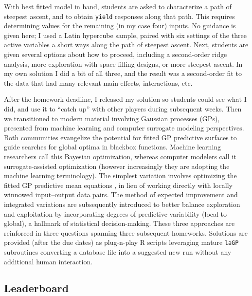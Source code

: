 \documentclass[12pt]{article}
\begin{document}
With best fitted model in hand, students are asked to characterize a path of
steepest ascent, and to obtain {\tt yield} responses along that path.  This
requires determining values for the remaining (in my case four) inputs. No
guidance is given here; I used a Latin hypercube sample, paired with six
settings of the three active variables a short ways along the path of steepest
ascent.  Next, students are given several options about how to proceed,
including a second-order ridge analysis, more exploration with space-filling
designs, or more steepest ascent.  In my own solution I did a bit of all
three, and the result was a second-order fit to the data that had many
relevant main effects, interactions, etc.

After the homework deadline, I released my solution so students could see what
I did, and use it to ``catch up'' with other players during subsequent weeks.
Then we transitioned to modern material involving Gaussian processes (GPs),
presented from machine learning \citep{rasmu:will:2006} and computer surrogate
modeling \citep{sant:will:notz:2003} perspectives.  Both communities
evangelize the potential for fitted GP predictive surfaces to guide searches
for global optima in blackbox functions. Machine learning researchers call
this Bayesian optimization, whereas computer modelers call it
surrogate-assisted optimization (however increasingly they are adopting the
machine learning terminology).  The simplest variation involves optimizing the
fitted GP predictive mean equations \citep{booker:etal:1999}, in lieu of
working directly with locally winnowed input--output data pairs. The method of
expected improvement \citep[EI,][]{jones:schonlau:welch:1998} and integrated
variations \citep[e.g., IECI,][]{gramacy:lee:2011} are subsequently introduced to
better balance exploration and exploitation by incorporating degrees of
predictive variability (local to global), a hallmark of statistical
decision-making. These three approaches are reinforced in three questions
spanning three subsequent homeworks.  Solutions are provided (after the due
dates) as plug-n-play {\sf R} scripts leveraging mature {\tt laGP} subroutines
\citep{gramacy:jss:2016} converting a database file into a suggested new run
without any additional human interaction.


\subsection{Leaderboard}
\label{sec:leader}
\end{document}

